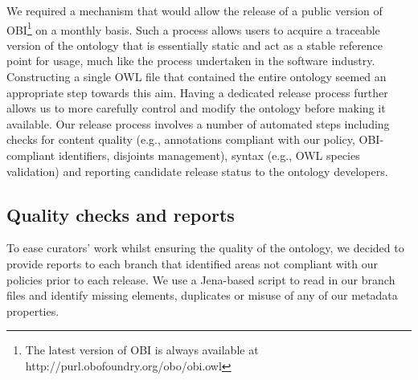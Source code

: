 \documentclass{elsart}       %
\begin{document}
We required a mechanism that would allow the release of a public version of OBI\footnote{The latest version of OBI is always available at http://purl.obofoundry.org/obo/obi.owl} on a monthly basis.
 Such a process allows users to acquire a traceable version of the ontology that is essentially static and act as a stable reference point for usage, much like the process undertaken in the software industry. 
 Constructing a single OWL file that contained the entire ontology seemed an appropriate step towards this aim.
Having a dedicated release process further allows us to more carefully control and modify the ontology before making it available.
Our release process involves a number of automated steps including checks for content quality (e.g., annotations compliant with our policy, OBI-compliant identifiers, disjoints management), syntax (e.g., OWL species validation) and reporting candidate release status to the ontology developers.




\subsection{Quality checks and reports}

To ease curators' work whilst ensuring the quality of the ontology, we decided to provide reports to each branch that identified areas not compliant with our policies prior to each release.
We use a Jena-based\cite{jena} script to read in our branch files and identify missing elements, duplicates or misuse of any of our metadata properties.
\end{document}
